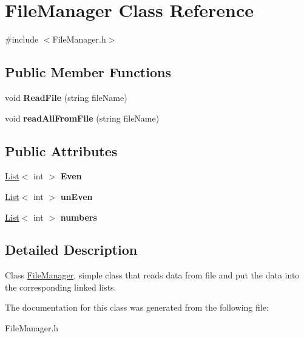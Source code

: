 \hypertarget{class_file_manager}{\section{File\-Manager Class Reference}
\label{class_file_manager}
}


{\ttfamily \#include $<$File\-Manager.\-h$>$}

\subsection*{Public Member Functions}
\begin{DoxyCompactItemize}
\item 
\hypertarget{class_file_manager_a980225cbe346f1d11d25f63bb32b1c0e}{void {\bfseries Read\-File} (string file\-Name)}\label{class_file_manager_a980225cbe346f1d11d25f63bb32b1c0e}

\item 
\hypertarget{class_file_manager_a596f89e21c77e7c4a8e7d4cdcf6340a4}{void {\bfseries read\-All\-From\-File} (string file\-Name)}\label{class_file_manager_a596f89e21c77e7c4a8e7d4cdcf6340a4}

\end{DoxyCompactItemize}
\subsection*{Public Attributes}
\begin{DoxyCompactItemize}
\item 
\hypertarget{class_file_manager_a5d4a30f74820ad2dd87399cfc39b7573}{\hyperlink{class_list}{List}$<$ int $>$ {\bfseries Even}}\label{class_file_manager_a5d4a30f74820ad2dd87399cfc39b7573}

\item 
\hypertarget{class_file_manager_a9d987e62f6e6fb8600d788c0d7988f94}{\hyperlink{class_list}{List}$<$ int $>$ {\bfseries un\-Even}}\label{class_file_manager_a9d987e62f6e6fb8600d788c0d7988f94}

\item 
\hypertarget{class_file_manager_a47cd3e33902227b75af7a2da0fde48b3}{\hyperlink{class_list}{List}$<$ int $>$ {\bfseries numbers}}\label{class_file_manager_a47cd3e33902227b75af7a2da0fde48b3}

\end{DoxyCompactItemize}


\subsection{Detailed Description}
Class \hyperlink{class_file_manager}{File\-Manager}, simple class that reads data from file and put the data into the corresponding linked lists. 

The documentation for this class was generated from the following file\-:\begin{DoxyCompactItemize}
\item 
File\-Manager.\-h\end{DoxyCompactItemize}
